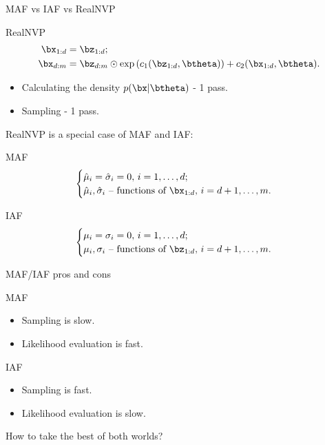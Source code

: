 \begin{frame}{MAF vs IAF vs RealNVP}
	\begin{block}{RealNVP}
		\vspace{-0.7cm}
		\begin{align*}
			\bx_{1:d} &= \bz_{1:d}; \\ \bx_{d:m} &= \bz_{d:m} \odot \exp \left(c_1(\bz_{1:d}, \btheta)\right) + c_2(\bx_{1:d}, \btheta).
		\end{align*}
		\vspace{-0.8cm}
	\end{block}
	\begin{itemize}
		\item Calculating the density $p(\bx | \btheta)$ - 1 pass.
		\item Sampling - 1 pass.
	\end{itemize}
	
	RealNVP is a special case of MAF and IAF:
	\begin{block}{MAF}
		\vspace{-0.5cm}
		\begin{equation*}
			\begin{cases}
				\hat{\mu}_i  = \hat{\sigma}_i = 0, \, i = 1, \dots, d; \\
				\hat{\mu}_i, \hat{\sigma}_i \text{ -- functions of } \bx_{1:d}, \, i = d+1, \dots, m.
			\end{cases}
		\end{equation*}
		\vspace{-0.3cm}
	\end{block}
	\begin{block}{IAF}
		\vspace{-0.3cm}
		\begin{equation*}
			\begin{cases}
				\mu_i  = \sigma_i = 0, \, i = 1, \dots, d; \\
				\mu_i, \sigma_i \text{ -- functions of } \bz_{1:d}, \, i = d+1, \dots, m.
			\end{cases}
		\end{equation*}
	\end{block}
\end{frame}
\begin{frame}{MAF/IAF pros and cons}
	\begin{block}{MAF}
		\begin{itemize}
			\item Sampling is slow.
			\item Likelihood evaluation is fast.
		\end{itemize}
	\end{block}
	\begin{block}{IAF}
		\begin{itemize}
			\item Sampling is fast.
			\item Likelihood evaluation is slow.
		\end{itemize}
	\end{block}
	\vspace{0.3cm}
	How to take the best of both worlds?
\end{frame}
